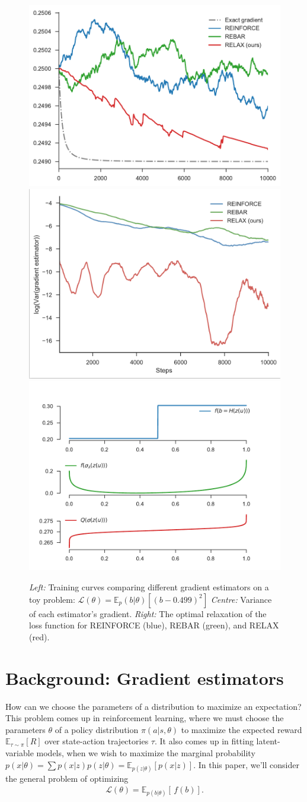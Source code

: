 \documentclass{article}
\newcommand{\discreteDist}{p(b|\theta)}
\newcommand{\loss}{f(b)}
\newcommand{\expectedLoss}{\mathbb{E}_{\discreteDist{}} \! \left[ \, \loss{} \right]}
\newcommand{\E}{\mathbb{E}}
\begin{document}
\begin{figure}[h]
\centering
\includegraphics[width=.325\textwidth]{figures/toy_losses_10000_0_499}
\includegraphics[width=.325\textwidth, clip, trim=3mm 3mm 3mm 3mm]{figures/variance}
\includegraphics[width=.325\textwidth]{figures/optimized-relaxation}
\caption{
\emph{Left:} Training curves comparing different gradient estimators on a toy problem: ${\mathcal{L}(\theta) = \E_p(b|\theta) [ (b - 0.499)^2 ]}$
\emph{Centre:} Variance of each estimator's gradient.
\emph{Right:} The optimal relaxation of the loss function for REINFORCE (blue), REBAR (green), and RELAX (red).
}
\label{first figure}
\end{figure}


\section{Background: Gradient estimators}
How can we choose the parameters of a distribution to maximize an expectation?
This problem comes up in reinforcement learning, where we must choose the parameters $\theta$ of a policy distribution $\pi(a|s, \theta)$ to maximize the expected reward $\mathbb{E}_{\tau \sim \pi} \left[ R \right]$ over state-action trajectories $\tau$.
It also comes up in fitting latent-variable models, when we wish to maximize the marginal probability ${p(x|\theta) = \sum p(x|z) p(z|\theta) = \mathbb{E}_{p(z|\theta)} \left[ p(x|z) \right]}$.
In this paper, we'll consider the general problem of optimizing
%
\begin{align}
\mathcal{L}(\theta)=\expectedLoss{}.
\end{align}
%
\end{document}
